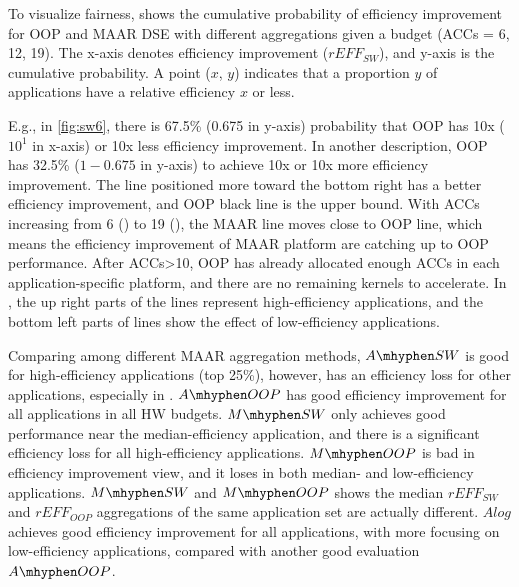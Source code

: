 To visualize fairness,  shows the cumulative probability of efficiency improvement for OOP and MAAR DSE with different aggregations given a budget (ACCs = 6, 12, 19).
The x-axis denotes efficiency improvement ($rEFF_{SW}$), and y-axis is the cumulative probability.
A point ($x$, $y$) indicates that a proportion $y$ of applications have a relative efficiency $x$ or less.  

E.g., in \ref{fig:sw6}, there is 67.5\% (0.675 in y-axis) probability that OOP has 10x ($10^1$ in x-axis) or 10x less efficiency improvement. In another description, OOP has 32.5\% ($1-0.675$ in y-axis) to achieve 10x or 10x more efficiency improvement. The line positioned more toward the bottom right has a better efficiency improvement, and OOP black line is the upper bound. With ACCs increasing from 6 () to 19 (), the MAAR line moves close to OOP line, which means the efficiency improvement of MAAR platform are catching up to OOP performance. After ACCs>10, OOP has already allocated enough ACCs in each application-specific platform, and there are no remaining kernels to accelerate. In , the up right parts of the lines represent high-efficiency applications, and the bottom left parts of lines show the effect of low-efficiency applications. 





Comparing among different MAAR aggregation methods, 
$A\mhyphen SW$ is good for high-efficiency applications (top 25\%), however, has an efficiency loss for other applications, especially in .
$A\mhyphen OOP$ has good efficiency improvement for all applications in all HW budgets.
$M\mhyphen SW$ only achieves good performance near the median-efficiency application, and there is a significant efficiency loss for all high-efficiency applications. 
$M\mhyphen OOP$ is bad in efficiency improvement view, and it loses in both median- and low-efficiency applications. 
$M\mhyphen SW$ and $M\mhyphen OOP$ shows the median $rEFF_{SW}$ and $rEFF_{OOP}$ aggregations of the same application set are actually different. 
$Alog$ achieves good efficiency improvement for all applications, with more focusing on low-efficiency applications, compared with another good evaluation $A\mhyphen OOP$.
